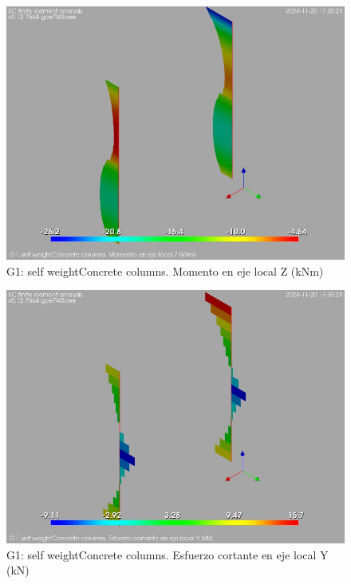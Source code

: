 \begin{figure}[ht]
\begin{center}
\includegraphics[width=\linewidth]{results/graphics/resSimplLC/GselfWeightcolumnZconcrMz.png}
\caption{ G1: self weightConcrete columns. Momento en eje local Z (kNm)}
\label{GselfWeightcolumnZconcrMz}
\end{center}
\end{figure}
\begin{figure}[ht]
\begin{center}
\includegraphics[width=\linewidth]{results/graphics/resSimplLC/GselfWeightcolumnZconcrVy.png}
\caption{ G1: self weightConcrete columns. Esfuerzo cortante en eje local Y (kN)}
\label{GselfWeightcolumnZconcrVy}
\end{center}
\end{figure}
